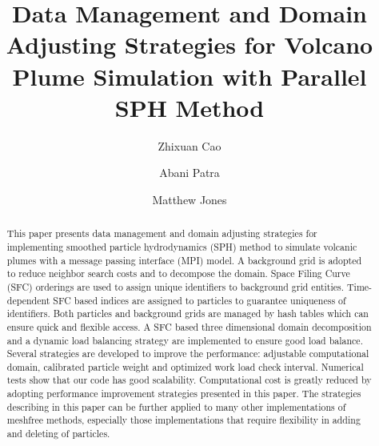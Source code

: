 \documentclass[procedia]{easychair}
\title{Data Management and Domain Adjusting Strategies for Volcano Plume Simulation with Parallel SPH Method}
\author{
    Zhixuan Cao\inst{1}%
\and
    Abani Patra\inst{1}
\and
    Matthew Jones\inst{2}%
}
\institute{
Department of MAE,
University at Buffalo, Buffalo, New York, U.S.A.\\
\and
Center for Computational Research,
University at Buffalo, Buffalo, New York, U.S.A.\\
 }
\begin{document}
\maketitle


\begin{abstract}
This paper presents data management and domain adjusting strategies for implementing smoothed particle hydrodynamics (SPH) method to simulate volcanic plumes with a
message passing interface (MPI) model. 
A background grid is adopted to reduce neighbor search costs and to decompose the domain. Space Filing Curve (SFC) orderings are used to assign unique identifiers to background grid entities. Time-dependent SFC based indices are assigned to particles to guarantee uniqueness of identifiers.  
Both particles and background grids are managed by hash tables which can ensure quick and flexible access.
A SFC based three dimensional domain decomposition and a dynamic load balancing strategy are implemented to ensure good load balance. 
Several strategies are developed to improve the performance: adjustable computational domain, calibrated particle weight and optimized work load check interval. 
Numerical tests show that our code has good scalability. Computational cost is greatly reduced by adopting performance improvement strategies presented in this paper. 
The strategies describing in this paper can be further applied to many other implementations of meshfree methods, especially those implementations that require flexibility in adding and deleting of particles.
\end{abstract}


%
%


\end{document}
